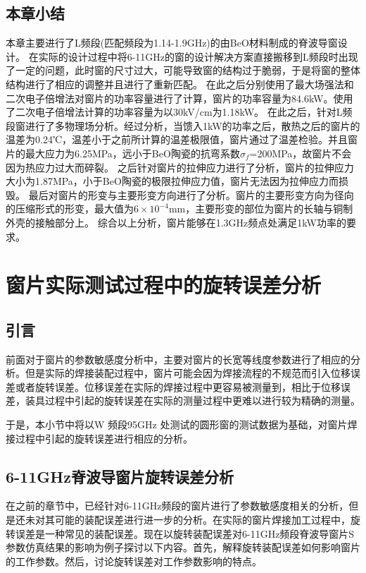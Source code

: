 \documentclass[master]{thesis-uestc}
\begin{document}
\section{本章小结}
本章主要进行了L频段(匹配频段为1.14-1.9GHz)的由BeO材料制成的脊波导窗设计。
在实际的设计过程中将6-11GHz的窗的设计解决方案直接搬移到L频段时出现了一定的问题，此时窗的尺寸过大，可能导致窗的结构过于脆弱，于是将窗的整体结构进行了相应的调整并且进行了重新匹配。
在此之后分别使用了最大场强法和二次电子倍增法对窗片的功率容量进行了计算，窗片的功率容量为84.6kW。使用了二次电子倍增法计算的功率容量为以30kV/cm为1.18kW。
在此之后，针对L频段窗进行了多物理场分析。经过分析，当馈入1kW的功率之后，散热之后的窗片的温差为0.24℃，温差小于之前所计算的温差极限值，窗片通过了温差检验。并且窗片的最大应力为6.25MPa，远小于BeO陶瓷的抗弯系数\(\sigma_f\)=200MPa，故窗片不会因为热应力过大而碎裂。
之后针对窗片的拉伸应力进行了分析，窗片的拉伸应力大小为1.87MPa，小于BeO陶瓷的极限拉伸应力值，窗片无法因为拉伸应力而损毁。
最后对窗片的形变与主要形变方向进行了分析。窗片的主要形变方向为径向的压缩形式的形变，最大值为\(6 \times 10^{-4}\)mm，主要形变的部位为窗片的长轴与铜制外壳的接触部分上。
综合以上分析，窗片能够在1.3GHz频点处满足1kW功率的要求。

\chapter{窗片实际测试过程中的旋转误差分析}
\section{引言}
前面对于窗片的参数敏感度分析中，主要对窗片的长宽等线度参数进行了相应的分析。但是实际的焊接装配过程中，窗片可能会因为焊接流程的不规范而引入位移误差或者旋转误差。位移误差在实际的焊接过程中更容易被测量到，相比于位移误差，装具过程中引起的旋转误差在实际的测量过程中更难以进行较为精确的测量。

于是，本小节中将以W 频段95GHz 处测试的圆形窗的测试数据为基础，对窗片焊接过程中引起的旋转误差进行相应的分析。

\section{6-11GHz脊波导窗片旋转误差分析}\label{sec:6-11GHz脊波导窗片旋转误差分析}
在之前的章节中，已经针对6-11GHz频段的窗片进行了参数敏感度相关的分析，但是还未对其可能的装配误差进行进一步的分析。在实际的窗片焊接加工过程中，旋转误差是一种常见的装配误差。现在以旋转装配误差对6-11GHz频段脊波导窗片S参数仿真结果的影响为例子探讨以下内容。首先，解释旋转装配误差如何影响窗片的工作参数。然后，讨论旋转误差对工作参数影响的特点。
\end{document}
